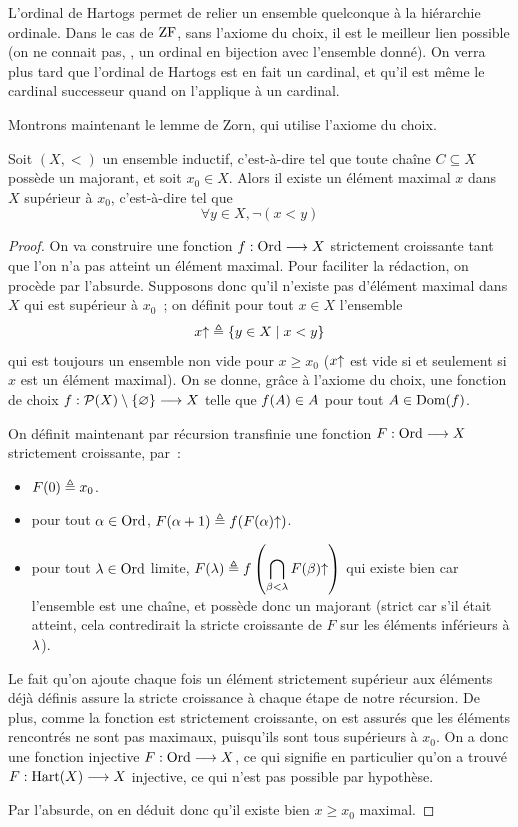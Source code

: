 L'ordinal de Hartogs permet de relier un ensemble quelconque à la hiérarchie
ordinale. Dans le cas de $\operatorname{ZF}$, sans l'axiome du choix, il est le meilleur lien
possible (on ne connait pas, , un ordinal en bijection avec
l'ensemble donné). On verra plus tard que l'ordinal de Hartogs est en fait un
cardinal, et qu'il est même le cardinal successeur quand on l'applique à un
cardinal.

Montrons maintenant le lemme de Zorn, qui utilise l'axiome du choix.

\begin{theorem}\label{thm.ordi.Zorn}
  Soit $(X,<)$ un ensemble inductif, c'est-à-dire tel que toute chaîne
  $C\subseteq X$ possède un majorant, et soit $x_0\in X$. Alors il existe un
  élément maximal $x$ dans $X$ supérieur à $x_0$, c'est-à-dire tel que
  \[\forall y \in X, \lnot (x < y)\]
\end{theorem}

\begin{proof}
  On va construire une fonction $f : \displaystyle \operatorname{Ord} \longrightarrow X$ strictement
  croissante tant que l'on n'a pas atteint un élément maximal. Pour faciliter la
  rédaction, on procède par l'absurde. Supposons donc qu'il n'existe pas
  d'élément maximal dans $X$ qui est supérieur à $x_0$~; on définit pour tout
  $x\in X$ l'ensemble
  \[x\mathbin{\uparrow}\triangleq \left\{ y \in X \;\middle\vert\; x < y \right\}\]
  qui est toujours un ensemble non vide pour $x \geq x_0$ ($x\mathbin{\uparrow}$ est vide
  si et seulement si $x$ est un élément maximal). On se donne, grâce à l'axiome
  du choix, une fonction de choix
  $f : \displaystyle \mathcal{P}(X)\setminus\{\varnothing\} \longrightarrow X$ telle que
  $f(A) \in A$ pour tout $A\in\operatorname{Dom}(f)$.

  On définit maintenant par récursion transfinie une fonction
  $F : \displaystyle \operatorname{Ord} \longrightarrow X$ strictement croissante, par~:
  \begin{itemize}
  \item $F(0)\triangleq x_0$.
  \item pour tout $\alpha\in\operatorname{Ord}$, $F(\alpha+1) \triangleq f(F(\alpha)\mathbin{\uparrow})$.
  \item pour tout $\lambda\in\operatorname{Ord}$ limite,
    $\displaystyle
    F(\lambda) \triangleq f\left(\bigcap_{\beta < \lambda}F(\beta)\mathbin{\uparrow}\right)$
    qui existe bien car l'ensemble est une chaîne, et possède donc un majorant
    (strict car s'il était atteint, cela contredirait la stricte croissante de
    $F$ sur les éléments inférieurs à $\lambda$).
  \end{itemize}
  Le fait qu'on ajoute chaque fois un élément strictement supérieur aux éléments
  déjà définis assure la stricte croissance à chaque étape de notre récursion.
  De plus, comme la fonction est strictement croissante, on est assurés que
  les éléments rencontrés ne sont pas maximaux, puisqu'ils sont tous supérieurs
  à $x_0$. On a donc une fonction injective $F : \displaystyle \operatorname{Ord} \longrightarrow X$, ce qui
  signifie en particulier qu'on a trouvé $F : \displaystyle \operatorname{Hart}(X) \longrightarrow X$
  injective, ce qui n'est pas possible par hypothèse.

  Par l'absurde, on en déduit donc qu'il existe bien $x \geq x_0$ maximal.
\end{proof}

